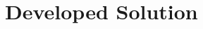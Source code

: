 \documentclass[xcolor=dvipsnames]{beamer}
\begin{document}
\begin{frame}

\end{frame}


\section{Developed Solution}
\end{document}

